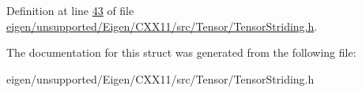 Definition at line \hyperlink{eigen_2unsupported_2_eigen_2_c_x_x11_2src_2_tensor_2_tensor_striding_8h_source_l00043}{43} of file \hyperlink{eigen_2unsupported_2_eigen_2_c_x_x11_2src_2_tensor_2_tensor_striding_8h_source}{eigen/unsupported/\+Eigen/\+C\+X\+X11/src/\+Tensor/\+Tensor\+Striding.\+h}.



The documentation for this struct was generated from the following file\+:\begin{DoxyCompactItemize}
\item 
eigen/unsupported/\+Eigen/\+C\+X\+X11/src/\+Tensor/\+Tensor\+Striding.\+h\end{DoxyCompactItemize}

